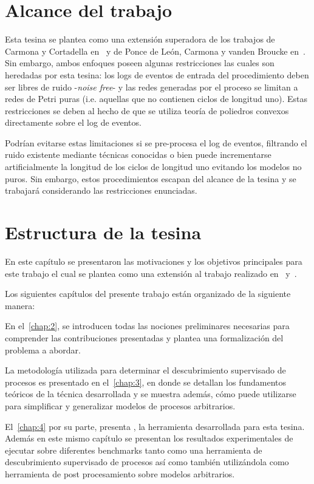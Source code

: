 \section{Alcance del trabajo}
\label{sec:alcance}

Esta tesina se plantea como una extensión superadora de los trabajos de Carmona y Cortadella en~\cite{CarmonaC14}
y de Ponce de León, Carmona y vanden Broucke en~\cite{LeonCB15}. 
Sin embargo, ambos enfoques poseen algunas restricciones las cuales son heredadas por esta tesina:
los logs de eventos de entrada del procedimiento deben ser libres de ruido -\textit{noise free}- y las redes generadas
por el proceso se limitan a redes de Petri puras (i.e. aquellas que no contienen ciclos de longitud uno).
Estas restricciones se deben al hecho de que se utiliza teoría de poliedros convexos directamente sobre el log de eventos.

Podrían evitarse estas limitaciones si se  pre-procesa el log de eventos, filtrando el ruido existente mediante
técnicas conocidas o bien puede incrementarse artificialmente la longitud de los ciclos de longitud uno evitando los modelos 
no puros. Sin embargo, estos procedimientos escapan del alcance de la tesina y se trabajará considerando las restricciones
enunciadas.

\section{Estructura de la tesina}
\label{sec:estructura}

En este capítulo se presentaron las motivaciones y los objetivos principales para este trabajo el cual se
plantea como una extensión al trabajo realizado en~\cite{CarmonaC14} y~\cite{LeonCB15}.


Los siguientes capítulos del presente trabajo están organizado de la siguiente manera:

En el~\autoref{chap:2}, se introducen todas las nociones preliminares necesarias para comprender las contribuciones 
presentadas y plantea una formalización del problema a abordar.

La metodología utilizada para determinar el descubrimiento supervisado de procesos es presentado en el~\autoref{chap:3}, 
en donde se detallan los fundamentos teóricos de la técnica desarrollada y se muestra además, cómo puede utilizarse para simplificar
y generalizar modelos de procesos arbitrarios.

El~\autoref{chap:4} por su parte, presenta \pachtool, la herramienta desarrollada para esta tesina. Además en este mismo capítulo
se presentan los resultados experimentales de ejecutar \pachtool sobre diferentes benchmarks tanto como una herramienta de descubrimiento
supervisado de procesos así como también utilizándola como herramienta de post procesamiento sobre modelos arbitrarios.

